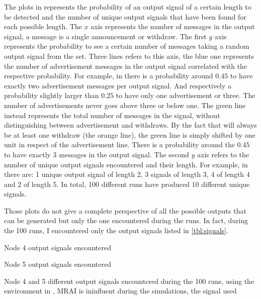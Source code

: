 The plots in  represents the probability of an
output signal of a certain length to be detected and the number of unique output signals
that have been found for each possible length.
The $x$ axis represents the number of messages in the output signal, a message
is a single announcement or withdraw.
The first $y$ axis represents the probability to see a certain number of messages
taking a random output signal from the set.
Three lines refers to this axis, the blue one represents the
number of advertisement messages in the output signal correlated with the
respective probability.
For example, in  there is a probability around $0.45$ to have
exactly two advertisement messages per output signal. And respectively a probability
slightly larger than $0.25$ to have only one advertisement or three.
The number of advertisements never goes above three or below one.
The green line instead represents the total number of messages in the signal,
without distinguishing between advertisement and withdraws.
By the fact that will always be at least one withdraw (the orange line), the
green line is simply shifted by one unit in respect of the advertisement line.
There is a probability around the $0.45$ to have exactly \num{3} messages in the
output signal.
The second $y$ axis refers to the number of unique output signals encountered and
their length.
For example, in  there are: \num{1} unique output signal
of length \num{2}, \num{3} signals of length \num{3}, \num{4} of length \num{4}
and \num{2} of length \num{5}.
In total, \num{100} different runs have produced \num{10} different unique signals.

Those plots do not give a complete perspective of all the possible outputs
that can be generated but only the one encountered during the runs.
In fact, during the \num{100} runs, I encountered only the output signals listed
in \cref{tbl:signals}.

\begin{table}[h]
	\begin{subtable}[h]{0.45\textwidth}
		
		\caption{Node \num{4} output signals encountered}
		\label{tab:node4_outSignals}
    \end{subtable}
	\hfill
	\begin{subtable}[h]{0.45\textwidth}
		
		\caption{Node \num{5} output signals encountered}
		\label{tab:node5_outSignals}
    \end{subtable}
		\caption{Node 4 and 5 different output signals encountered during the \num{100}
		runs, using the environment in ,
		\ac{MRAI} is ininfluent during the simulations, the signal used }
	\label{tbl:signals}
\end{table}


